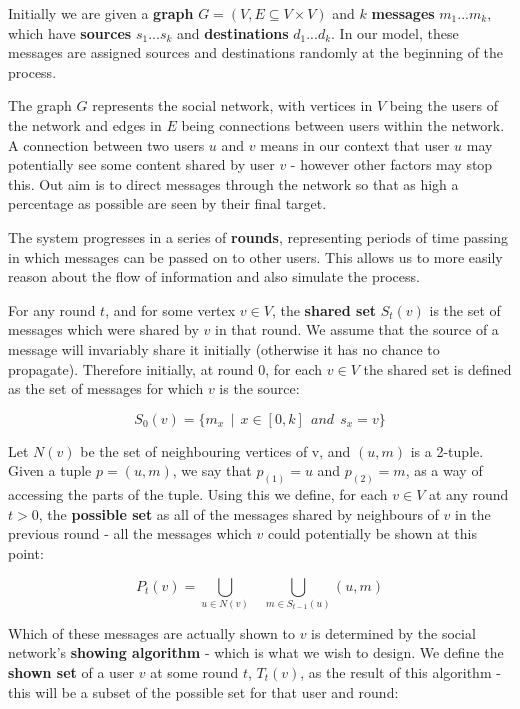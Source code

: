 \documentclass[bsc,frontabs,twoside,singlespacing,parskip,deptreport]{infthesis}     %
\begin{document}
Initially we are given a \textbf{graph} $G = (V, E \subseteq V \times V)$ and $k$ \textbf{messages} $ m_{1} ... m_{k}$, which have \textbf{sources} $s_{1} ... s_{k}$ and \textbf{destinations} $d_{1} ... d_{k}$. In our model, these messages are assigned sources and destinations randomly at the beginning of the process.

The graph $G$ represents the social network, with vertices in $V$ being the users of the network and edges in $E$ being connections between users within the network. A connection between two users $u$ and $v$ means in our context that user $u$ may potentially see some content shared by user $v$ - however other factors may stop this. Out aim is to direct messages through the network so that as high a percentage as possible are seen by their final target.

The system progresses in a series of \textbf{rounds}, representing periods of time passing in which messages can be passed on to other users. This allows us to more easily reason about the flow of information and also simulate the process.

For any round $t$, and for some vertex $v \in V$, the \textbf{shared set} $S_{t}(v)$ is the set of messages which were shared by $v$ in that round. We assume that the source of a message will invariably share it initially (otherwise it has no chance to propagate). Therefore initially, at round 0, for each $v \in V$ the shared set is defined as the set of messages for which $v$ is the source:

\begin{equation}
S_{0}(v) = \{m_{x} \:\: | \:\: x \in [0, k] \:\: and \:\: s_{x} = v\}
\end{equation}


Let $N(v)$ be the set of neighbouring vertices of v, and $(u, m)$ is a 2-tuple. Given a tuple $p = (u, m)$, we say that $p_{(1)} = u$ and $p_{(2)} = m$, as a way of accessing the parts of the tuple. Using this we define, for each $v \in V$ at any round $t > 0$, the \textbf{possible set} as all of the messages shared by neighbours of $v$ in the previous round - all the messages which $v$ could potentially be shown at this point:

\begin{equation}
P_{t}(v) = \bigcup_{u \in N(v)} \:\:\:\: \bigcup_{m \in S_{t-1}(u)} (u, m)
\end{equation}

Which of these messages are actually shown to $v$ is determined by the social network's \textbf{showing algorithm} - which is what we wish to design. We define the \textbf{shown set} of a user $v$ at some round $t$, $T_{t}(v)$, as the result of this algorithm - this will be a subset of the possible set for that user and round:
\end{document}

